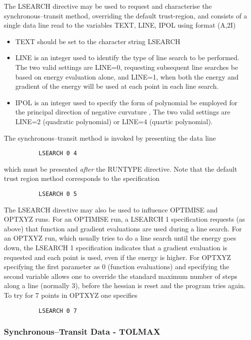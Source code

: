 \documentclass[11pt,fleqn]{article}
\begin{document}
The LSEARCH directive may be used to request and characterise
the synchronous--transit
method, overriding  the default trust-region, and consists of a 
single data line read to the variables TEXT, LINE, IPOL
using format (A,2I)
\begin{itemize}
\item TEXT should be set to the character string LSEARCH
\item LINE is an integer used to identify the type of line search
to be performed. The two valid settings are LINE=0, requesting
subsequent line searches be based on energy evaluation alone, and
LINE=1, when both the energy and gradient of the energy will
be used at each point in each line search.
\item IPOL is an integer used to specify the form of polynomial
be employed for the principal direction
of negative curvature \cite{bell}, The two valid settings are
LINE=2  (quadratic polynomial) or LINE=4 (quartic polynomial).
\end{itemize}
The synchronous--transit method is invoked by presenting the
data line

{
\footnotesize
\begin{verbatim}
          LSEARCH 0 4
\end{verbatim}
}
which must be presented {\em after} the RUNTYPE directive.
Note that the default trust region method corresponds to the
specification

{
\footnotesize
\begin{verbatim}
          LSEARCH 0 5
\end{verbatim}
}

The LSEARCH directive may also be used to influence OPTIMISE and OPTXYZ runs. For
an OPTIMISE run, a LSEARCH 1 specification requests (as above) that function and
gradient evaluations are used during a line search.  For an OPTXYZ run, which 
usually tries to do a line search until the energy goes down, the LSEARCH 1 
specification indicates that a gradient evaluation is requested and each point is
used, even if the energy is higher. For OPTXYZ specifying the first parameter
as 0 (function evaluations) and specifying the second variable allows one to override
the standard maximum number of steps along a line (normally 3), before the hessian is
reset and the program tries again. To try for 7 points in OPTXYZ one specifies 
{
\footnotesize
\begin{verbatim}
          LSEARCH 0 7
\end{verbatim}
}

\subsubsection[Synchronous--Transit Data - TOLMAX]{Synchronous--Transit Data - TOLMAX}
\end{document}
